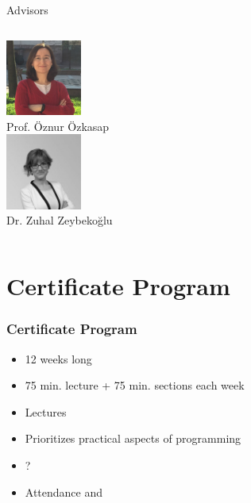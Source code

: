 \begin{frame}{Advisors}
\begin{columns}
        \column{3.333cm}
          \centering
          \includegraphics[width=2.5cm]{images/oozkasap.jpg}\\
          Prof. Öznur Özkasap\\
          \vspace{2.5mm}
          \includegraphics[width=2.5cm]{images/zzeybekoglu.jpg}\\
          Dr. Zuhal Zeybekoğlu\\
			\end{columns}
    
    \end{frame}

    \section{Certificate Program}
      \begin{frame}
        \frametitle{Certificate Program}
        \LARGE
        \pause
        \begin{itemize}
          \item 12 weeks long
          \item 75 min. lecture + 75 min. sections each week
          \item Lectures 
          \item Prioritizes practical aspects of programming
          \item ?
          \item Attendance and 
        \end{itemize}

      \end{frame}

